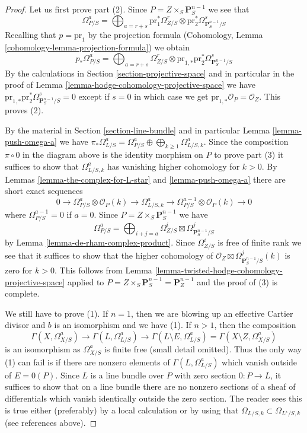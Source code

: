 \begin{proof}
Let us first prove part (2). Since
$P = Z \times_S \mathbf{P}^{n - 1}_S$
we see that
$$
\Omega^a_{P/S} = \bigoplus\nolimits_{a = r + s}
\text{pr}_1^*\Omega^r_{Z/S} \otimes
\text{pr}_2^*\Omega^s_{\mathbf{P}^{n - 1}_S/S}
$$
Recalling that $p = \text{pr}_1$ by the projection formula
(Cohomology, Lemma \ref{cohomology-lemma-projection-formula})
we obtain
$$
p_*\Omega^a_{P/S} = \bigoplus\nolimits_{a = r + s}
\Omega^r_{Z/S} \otimes
\text{pr}_{1, *}\text{pr}_2^*\Omega^s_{\mathbf{P}^{n - 1}_S/S}
$$
By the calculations in Section \ref{section-projective-space}
and in particular in
the proof of Lemma \ref{lemma-hodge-cohomology-projective-space}
we have $\text{pr}_{1, *}\text{pr}_2^*\Omega^s_{\mathbf{P}^{n - 1}_S/S} = 0$
except if $s = 0$ in which case we get
$\text{pr}_{1, *}\mathcal{O}_P = \mathcal{O}_Z$.
This proves (2).

\medskip\noindent
By the material in Section \ref{section-line-bundle} and in particular
Lemma \ref{lemma-push-omega-a} we have
$\pi_*\Omega^a_{L/S} = \Omega^a_{P/S} \oplus
\bigoplus_{k \geq 1} \Omega^a_{L/S, k}$.
Since the composition $\pi \circ 0$ in the diagram above
is the identity morphism on $P$ to prove part (3) it suffices to show that
$\Omega^a_{L/S, k}$ has vanishing higher cohomology for $k > 0$.
By Lemmas \ref{lemma-the-complex-for-L-star} and \ref{lemma-push-omega-a}
there are short exact sequences
$$
0 \to \Omega^a_{P/S} \otimes \mathcal{O}_P(k)
\to \Omega^a_{L/S, k} \to
\Omega^{a - 1}_{P/S} \otimes \mathcal{O}_P(k) \to 0
$$
where $\Omega^{a - 1}_{P/S} = 0$ if $a = 0$. Since
$P = Z \times_S \mathbf{P}^{n - 1}_S$ we have
$$
\Omega^a_{P/S} = \bigoplus\nolimits_{i + j = a}
\Omega^i_{Z/S} \boxtimes \Omega^j_{\mathbf{P}^{n - 1}_S/S}
$$
by Lemma \ref{lemma-de-rham-complex-product}.
Since $\Omega^i_{Z/S}$ is free of finite rank
we see that it suffices to show that the higher cohomology of
$\mathcal{O}_Z \boxtimes \Omega^j_{\mathbf{P}^{n - 1}_S/S}(k)$
is zero for $k > 0$. This follows from
Lemma \ref{lemma-twisted-hodge-cohomology-projective-space}
applied to $P = Z \times_S \mathbf{P}^{n - 1}_S = \mathbf{P}^{n - 1}_Z$
and the proof of (3) is complete.

\medskip\noindent
We still have to prove (1). If $n = 1$, then we are blowing
up an effective Cartier divisor and $b$ is an isomorphism
and we have (1). If $n > 1$, then the composition
$$
\Gamma(X, \Omega^a_{X/S})
\to
\Gamma(L, \Omega^a_{L/S})
\to
\Gamma(L \setminus E, \Omega^a_{L/S})
=
\Gamma(X \setminus Z, \Omega^a_{X/S})
$$
is an isomorphism as $\Omega^a_{X/S}$ is finite free
(small detail omitted). Thus the only way (1) can fail is if
there are nonzero elements of $\Gamma(L, \Omega^a_{L/S})$ which vanish
outside of $E = 0(P)$. Since $L$ is a line bundle over $P$
with zero section $0 : P \to L$, it suffices to show that
on a line bundle there are no nonzero sections of a sheaf
of differentials which vanish identically outside the zero section.
The reader sees this is true either (preferably) by a local calculation
or by using that $\Omega_{L/S, k} \subset \Omega_{L^\star/S, k}$
(see references above).
\end{proof}

